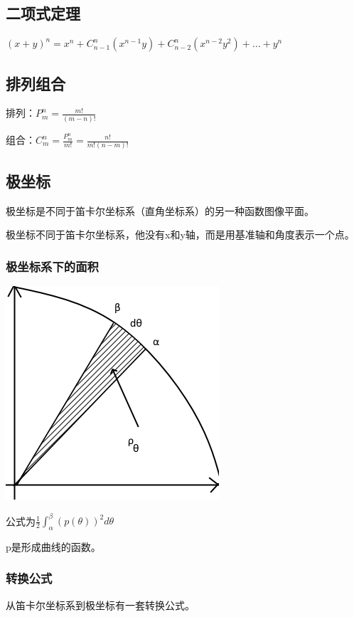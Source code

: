 \documentclass[UTF8]{ctexbook}
\newcommand{\mathCombination}[2]{C_{#1}^{#2}}
\newcommand{\mathPermutation}[2]{P_{#1}^{#2}}
\newcommand{\definiteIntegral}[2]{\int^{#1}_{#2}}
\begin{document}
{{\subsection{二项式定理}{
  $(x + y)^n = x^n + \mathCombination{n - 1}{n}(x^{n-1} y) + \mathCombination{n - 2}{n}(x^{n-2} y^2) + \dots + y^n$
}%

\subsection{排列组合}{
  排列：$\mathPermutation{m}{n} = \frac{m!}{(m-n)!}$

  组合：$\mathCombination{m}{n} = \frac{\mathPermutation{m}{n}}{m!} = \frac{n!}{m!(n-m)!}$
}%

\subsection{极坐标}{
极坐标是不同于笛卡尔坐标系（直角坐标系）的另一种函数图像平面。

极坐标不同于笛卡尔坐标系，他没有x和y轴，而是用基准轴和角度表示一个点。

\subsubsection{极坐标系下的面积}{
  \includegraphics{resources/polar_coordness.png}

  公式为$\frac{1}{2}\definiteIntegral{\beta}{\alpha}(p(\theta))^2d\theta$

  p是形成曲线的函数。
  }%

  \subsubsection{转换公式}{
    从笛卡尔坐标系到极坐标有一套转换公式。

}}}}
\end{document}
